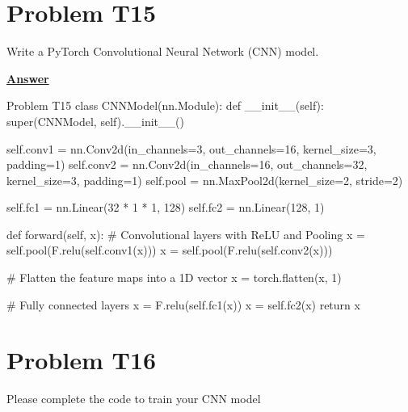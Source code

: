 \documentclass[12pt, a4paper]{article}
\begin{document}
	\pagebreak

        \section{Problem T15}
            \noindent Write a PyTorch Convolutional Neural Network (CNN) model.

            \vspace{1em}

            \noindent \underline{\textbf{Answer}}

            \vspace{0.25em}

            \begin{codeblock}{Problem T15}
                class CNNModel(nn.Module):
                    def __init__(self):
                        super(CNNModel, self).__init__()

                        self.conv1 = nn.Conv2d(in_channels=3, out_channels=16, kernel_size=3, padding=1)
                        self.conv2 = nn.Conv2d(in_channels=16, out_channels=32, kernel_size=3, padding=1)
                        self.pool = nn.MaxPool2d(kernel_size=2, stride=2)

                        self.fc1 = nn.Linear(32 * 1 * 1, 128)
                        self.fc2 = nn.Linear(128, 1)

                    def forward(self, x):
                        # Convolutional layers with ReLU and Pooling
                        x = self.pool(F.relu(self.conv1(x)))
                        x = self.pool(F.relu(self.conv2(x)))

                        # Flatten the feature maps into a 1D vector
                        x = torch.flatten(x, 1) 

                        # Fully connected layers
                        x = F.relu(self.fc1(x))
                        x = self.fc2(x)
                        return x
            \end{codeblock}

	\pagebreak

        \section{Problem T16}
            \noindent Please complete the code to train your CNN model
\end{document}
